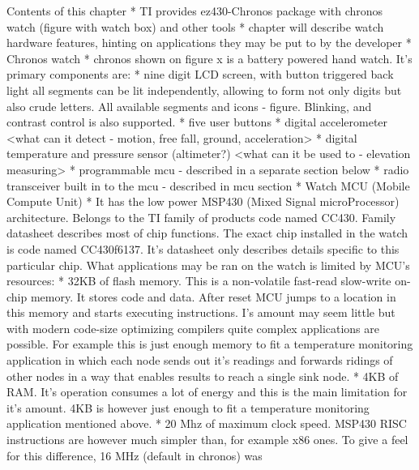 \begin{commnet}
  Contents of this chapter
    * TI provides ez430-Chronos package with chronos watch (figure
    with watch box) and other tools
    * chapter will describe watch hardware features, hinting on
    applications they may be put to by the developer
    * Chronos watch
      * chronos shown on figure x is a battery powered hand watch. It's
        primary components are:
      * nine digit LCD screen, with button triggered back light all segments can
        be lit independently, allowing to form not only digits but also crude
        letters. All available segments and icons - figure. Blinking, and
        contrast control is also supported.
      * five user buttons
      * digital accelerometer
        <what can it detect - motion, free fall, ground, acceleration>
      * digital temperature and pressure sensor (altimeter?)
        <what can it be used to - elevation measuring>
      * programmable mcu - described in a separate section below
      * radio transceiver built in to the mcu - described in mcu section
    * Watch MCU (Mobile Compute Unit)
      * It has the low power MSP430 (Mixed Signal microProcessor) architecture.
        Belongs to the TI family of products code named CC430. Family datasheet
        describes most of chip functions.  The exact chip installed in the
        watch is code named CC430f6137. It's datasheet only describes details
        specific to this particular chip. What applications may be ran on the
        watch is limited by MCU's resources:
        * 32KB of flash memory. This is a non-volatile fast-read slow-write
          on-chip memory. It stores code and data. After reset MCU jumps to a
          location in this memory and starts executing instructions. I's amount
          may seem little but with modern code-size optimizing compilers quite
          complex applications are possible. For example this is just enough
          memory to fit a temperature monitoring application in which each node
          sends out it's readings and forwards ridings of other nodes in a way
          that enables results to reach a single sink node.
        * 4KB of RAM. It's operation consumes a lot of energy and this is the
          main limitation for it's amount. 4KB is however just enough to fit a
          temperature
          monitoring application mentioned above.
        * 20 Mhz of maximum clock speed. MSP430 RISC instructions are
          however much simpler than, for example x86 ones. To give a
          feel for this difference, 16 MHz (default in chronos) was

\end{commnet}
